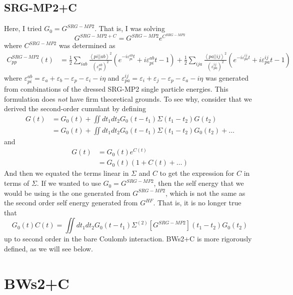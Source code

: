 \subsection{SRG-MP2+C}
Here, I tried $G_0 = G^{SRG-MP2}$. That is, I was solving
\begin{equation}G^{SRG-MP2+C} = G^{SRG-MP2} e^{C^{SRG-MP2}}\end{equation}
where $C^{SRG-MP2}$ was determined as
\begin{align}
  C_{pp}^{SRG-MP2}(t)  &= \frac{1}{2}\sum_{iab} \frac{\left< pi \left| \right| ab \right>^2}{\left(\varepsilon_{pi}^{ab}\right)^2}
\left(e^{-i \varepsilon_{pi}^{ab} t} +i \varepsilon_{pi}^{ab} t -1 \right)
+\frac{1}{2}\sum_{ija} \frac{\left< pa \left| \right| ij \right>^2}{\left(\varepsilon_{pa}^{ij}\right)^2}
\left(e^{-i \varepsilon_{pa}^{ij} t} +i \varepsilon_{pa}^{ij} t -1 \right) 
\end{align}
where $\varepsilon_{pi}^{ab} = \varepsilon_{a}+\varepsilon_{b}-\varepsilon_{p}-\varepsilon_{i} - i\eta$ and $\varepsilon_{pa}^{ij} = \varepsilon_{i}+\varepsilon_{j}-\varepsilon_{p}-\varepsilon_{a} - i\eta$ was generated from combinations of the dressed SRG-MP2 single particle energies. This formulation does \emph{not} have firm theoretical grounds. To see why, consider that we derived the second-order cumulant by defining
\begin{align}
G(t) &= G_0(t) + \iint dt_1 dt_2 G_0(t-t_1) \Sigma(t_1 - t_2) G(t_2) \\
&= G_0(t) + \iint dt_1 dt_2 G_0(t-t_1) \Sigma(t_1 - t_2) G_0(t_2) + \ldots
\end{align}
and 
\begin{align}
G(t) & = G_0(t) e^{C(t)} \\
& = G_0(t) \left(1 + C(t) + \ldots\right)
\end{align}
And then we equated the terms linear in $\Sigma$ and $C$ to get the expression for $C$ in terms of $\Sigma$. If we wanted to use $G_0 = G^{SRG-MP2}$, then the self energy that we would be using is the one generated from $G^{SRG-MP2}$, which is not the same as the second order self energy generated from $G^{HF}$. That is, it is no longer true that
\begin{equation}
G_0(t) C(t) = \iint dt_1 dt_2 G_0(t-t_1) \Sigma^{(2)}[G^{SRG-MP2}](t_1 - t_2) G_0(t_2)
\end{equation}
up to second order in the bare Coulomb interaction. BWs2+C is more rigorously defined, as we will see below.

\section{BWs2+C}
